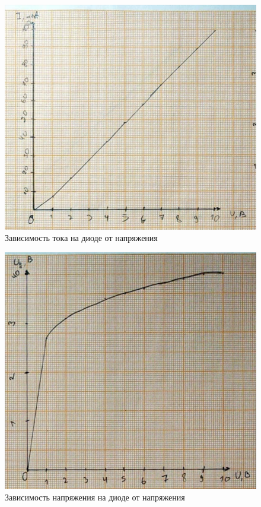 \documentclass{labreport}
\begin{document}
\begin{figure}[h]
    \centering
    \includegraphics[width=\linewidth]{graph_h_i.png}
    \caption{Зависимость тока на диоде от напряжения}
\end{figure}

\begin{figure}[h]
    \centering
    \includegraphics[width=\linewidth]{graph_h_u_d.png}
    \caption{Зависимость напряжения на диоде от напряжения}
\end{figure}
\end{document}
